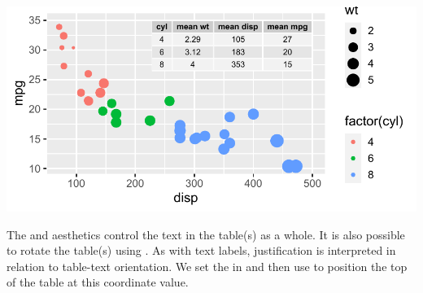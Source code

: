 \documentclass[krantz2]{krantz}\usepackage{knitr}
\begin{document}
\begin{knitrout}\footnotesize
{}\color{fgcolor}\begin{kframe}
\begin{alltt}
\hlstd{(}  \hlstd{(}   
                           \hlstd{=} 
                           
                            \hlopt{+}
  \hlstd{()} \hlopt{+}
  \hlstd{()} \hlopt{+}
  \hlstd{(} 
             \hlstd{(}     
              \hlstd{=} \hlstd{,}  \hlstd{=} \hlstd{)}
\end{alltt}
\end{kframe}

{\centering \includegraphics[width=.7\textwidth]{figure/pos-table-plot-02-1} 

}


\end{knitrout}

The  and  aesthetics control the text in the table(s) as a whole.
It is also possible to rotate the table(s) using . As with text labels, justification is interpreted in relation to table-text orientation. We set the  in  and then use  to position the top of the table at this coordinate value.

\begin{knitrout}\footnotesize
{}\color{fgcolor}\begin{kframe}
\begin{alltt}
\hlstd{(}  \hlstd{(}     \hlstd{=}  \hlopt{+}
  \hlstd{()} \hlopt{+}
  \hlstd{(} 
             \hlstd{(}     
              \hlstd{=} \hlstd{,}  \hlstd{=} \hlstd{,}
              \hlstd{=} \hlstd{,}  \hlstd{=} \hlstd{,}  \hlstd{=} \hlstd{)}
\end{alltt}
\end{kframe}
\end{knitrout}
\end{document}
